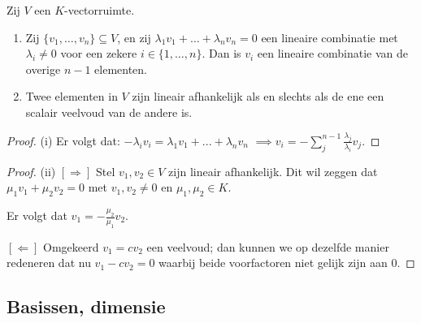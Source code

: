 \begin{lemma}[2.3.6]
    Zij $V$ een $K$-vectorruimte.
    \begin{enumerate}
        \item[(i)] Zij $\{v_1, \dots, v_n\} \subseteq V$, en zij $\lambda_1 v_1 + \dots + \lambda_n v_n = 0$ een lineaire combinatie met $\lambda_i \neq 0$ voor een zekere $i \in \{1, \dots, n\}$. Dan is $v_i$ een lineaire combinatie van de overige $n - 1$ elementen.
        \item[(ii)] Twee elementen in $V$ zijn lineair afhankelijk als en slechts als de ene een scalair veelvoud van de andere is.
    \end{enumerate}
\end{lemma}
\begin{proof}(i)
    Er volgt dat: \(-\lambda_i v_i = \lambda_1 v_1 + ... +\lambda_n v_n\)
    \(\implies v_i = -\sum_{j}^{n-1} \frac{\lambda_j}{\lambda_i} v_j  \).
\end{proof}
\begin{proof}(ii)
    \([\Rightarrow]\) Stel \(v_1,v_2 \in V\) zijn lineair afhankelijk.
    Dit wil zeggen dat \(\mu_1 v_1 + \mu_2 v_2 = 0\) met \(v_1, v_2 \neq 0\) en \(\mu_1, \mu_2 \in K\).

    Er volgt dat \(v_1 = -\frac{\mu_2}{\mu_1}v_2\).

    \([\Leftarrow]\) Omgekeerd \(v_1 = c v_2\) een veelvoud;
    dan kunnen we op dezelfde manier redeneren dat nu \(v_1 - c v_2 = 0\) waarbij beide voorfactoren niet gelijk zijn aan 0.
\end{proof}

\subsection{Basissen, dimensie}

